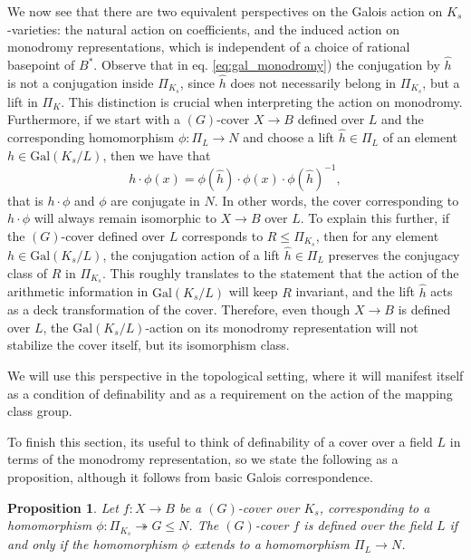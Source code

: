 \documentclass[10pt]{amsart}
\newtheorem{proposition}[theorem]{Proposition}
\theoremstyle{definition}
\newcommand{\Gal}{{ \mathrm{Gal}}}
\begin{document}
We now see that there are two equivalent perspectives on the Galois action on $K_s$-varieties: 
the natural action on coefficients, and the induced action on monodromy representations, which is independent of a choice of rational basepoint of $B^*$.
Observe that in eq. \ref{eq:gal_monodromy}) the conjugation by $\hat{h}$ is not a conjugation inside $\Pi_{K_s}$, since $\hat{h}$ does not necessarily belong in $\Pi_{K_s}$, but a lift in $\Pi_K$. This distinction is crucial when interpreting the action on monodromy.
Furthermore, if we start with a $(G)$-cover $X\to B$ defined over $L$ and the corresponding homomorphism $\phi \colon \Pi_L \rightarrow N$ and choose a lift $\hat{h} \in \Pi_L$ of an element $h\in \Gal(K_s/L)$, then we have that 
\[
h \cdot \phi (x) = \phi(\hat{h} )\cdot  \phi(x) \cdot \phi (\hat{h})^{-1}, 
\] 
that is $h\cdot \phi$ and $\phi$ are conjugate in $N$. In other words, the cover corresponding to $h\cdot \phi$ will always remain isomorphic to $X\rightarrow B$ over $L$. To explain this further, if the $(G)$-cover defined over $L$ corresponds to $R \leq \Pi_{K_s}$, then for any element $h \in \Gal(K_s/L)$, the conjugation action of a lift $\hat{h}\in \Pi_L$ preserves the conjugacy class of $R$ in $\Pi_{K_s}$. This roughly translates to the statement that the action of the arithmetic information in $\Gal(K_s/L)$ will keep $R$ invariant, and the lift $\hat{h}$ acts as a deck transformation of the cover. Therefore, even though $X\rightarrow B$ is defined over $L$, the $\Gal(K_s/L)$-action on its monodromy representation will not stabilize the cover itself, but its isomorphism class.

We will use this perspective in the topological setting, where it will manifest itself as a condition of definability and as a requirement on the action of the mapping class group.

To finish this section, its useful to think of definability of a cover over a field $L$ in terms of the monodromy representation, so we state the following as a proposition, although it follows from basic Galois correspondence.



\begin{proposition}
  \label{prop:DebesArith}
Let $f\colon X \rightarrow B$ be a  $(G)$-cover over $K_s$, corresponding to a homomorphism $\phi \colon \Pi_{K_s} \twoheadrightarrow G \leq N$. The $(G)$-cover $f$ is defined over the field $L$ if and only if the homomorphism $\phi$ extends to a homomorphism $\Pi_L \rightarrow N$. 

\end{proposition}
\end{document}
